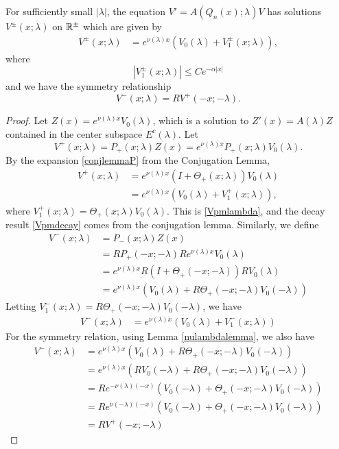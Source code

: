 \documentclass[thesis.tex]{subfiles}
\begin{document}
\begin{lemma}\label{lemma:Vpm}
For sufficiently small $|\lambda|$, the equation $V' = A(Q_n(x); \lambda)V$ has solutions $V^\pm(x; \lambda)$ on $\mathbb{R}^\pm$ which are given by
\begin{align}\label{Vpmlambda}
V^\pm(x; \lambda) &= e^{\nu(\lambda)x}(V_0(\lambda) + V_1^\pm(x; \lambda)),
\end{align}
where
\begin{equation}\label{Vpmdecay}
|V_1^\pm(x; \lambda)| \leq C e^{-\alpha |x|}
\end{equation}
and we have the symmetry relationship
\begin{equation}\label{Vpmsymmetry}
V^-(x; \lambda) = R V^+(-x; -\lambda).
\end{equation}
\begin{proof}
Let $Z(x) = e^{\nu(\lambda)x}V_0(\lambda)$, which is a solution to $Z'(x) = A(\lambda)Z$ contained in the center subspace $E^c(\lambda)$. Let
\begin{equation}\label{defVplus}
V^+(x; \lambda) = P_+(x; \lambda) Z(x) = e^{\nu(\lambda)x}P_+(x; \lambda)V_0(\lambda).
\end{equation}
By the expansion \eqref{conjlemmaP} from the Conjugation Lemma,
\begin{align*}
V^+(x; \lambda) &= e^{\nu(\lambda)x}(I + \Theta_+(x; \lambda))V_0(\lambda) \\
&= e^{\nu(\lambda)x}( V_0(\lambda) + V_1^+(x; \lambda)),
\end{align*}
where $V_1^+(x; \lambda) = \Theta_+(x; \lambda) V_0(\lambda)$. This is \eqref{Vpmlambda}, and the decay result \eqref{Vpmdecay} comes from the conjugation lemma. Similarly, we define 
\begin{align*}
V^-(x; \lambda) &= P_-(x; \lambda) Z(x) \\
&= RP_+(-x; -\lambda)R e^{\nu(\lambda)x} V_0(\lambda) \\
&= e^{\nu(\lambda)x} R(I + \Theta_+(-x; -\lambda))R V_0(\lambda) \\
&= e^{\nu(\lambda)x}( V_0(\lambda) + R\Theta_+(-x; -\lambda) V_0(-\lambda) )
\end{align*}
Letting $V_1^-(x; \lambda) = R\Theta_+(-x; -\lambda) V_0(-\lambda)$, we have
\begin{align*}
V^-(x; \lambda) &= e^{\nu(\lambda)x}( V_0(\lambda) + V_1^-(x; \lambda))
\end{align*}
For the symmetry relation, using Lemma \ref{nulambdalemma}, we also have
\begin{align*}
V^-(x; \lambda) &= e^{\nu(\lambda)x}( V_0(\lambda) + R\Theta_+(-x; -\lambda) V_0(-\lambda) ) \\
&= e^{\nu(\lambda)x}( R V_0(-\lambda) + R\Theta_+(-x; -\lambda) V_0(-\lambda) ) \\
&= R e^{-\nu(\lambda)(-x)}( V_0(-\lambda) + \Theta_+(-x; -\lambda) V_0(-\lambda) ) \\
&= R e^{\nu(-\lambda)(-x)}( V_0(-\lambda) + \Theta_+(-x; -\lambda) V_0(-\lambda) ) \\
&= R V^+(-x; -\lambda)
\end{align*}
\end{proof}
\end{lemma}
\end{document}
